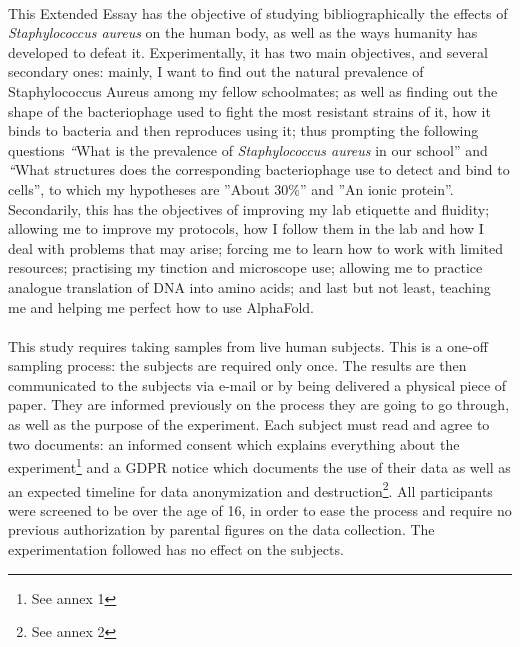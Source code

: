 \paragraph{}This Extended Essay has the objective of studying bibliographically the effects of \emph{Staphylococcus aureus} on the human body, as well as the ways humanity has developed to defeat it. Experimentally, it has two main objectives, and several secondary ones: mainly, I want to find out the natural prevalence of Staphylococcus Aureus among my fellow schoolmates; as well as finding out the shape of the bacteriophage used to fight the most resistant strains of it, how it binds to bacteria and then reproduces using it; thus prompting the following questions \emph“What is the prevalence of \emph{Staphylococcus aureus} in our school” and \emph“What structures does the corresponding bacteriophage use to detect and bind to cells”, to which my hypotheses are ”About 30\%” and ”An ionic protein”. Secondarily, this has the objectives of improving my lab etiquette and fluidity; allowing me to improve my protocols, how I follow them in the lab and how I deal with problems that may arise; forcing me to learn how to work with limited resources; practising my tinction and microscope use; allowing me to practice analogue translation of DNA into amino acids; and last but not least, teaching me and helping me perfect how to use AlphaFold.

\paragraph{}This study requires taking samples from live human subjects. This is a one-off sampling process: the subjects are required only once. The results are then communicated to the subjects via e-mail or by being delivered a physical piece of paper. They are informed previously on the process they are going to go through, as well as the purpose of the experiment. Each subject must read and agree to two documents: an informed consent which explains everything about the experiment\footnote{See annex 1} and a GDPR notice which documents the use of their data as well as an expected timeline for data anonymization and destruction\footnote{See annex 2}. All participants were screened to be over the age of 16, in order to ease the process and require no previous authorization by parental figures on the data collection. The experimentation followed has no effect on the subjects\cite{WhatGDPREU2018}.
